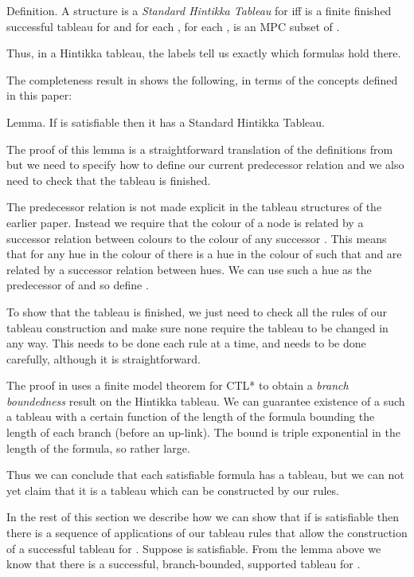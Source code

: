 \documentclass[submission,copyright,creativecommons]{eptcs}
\newenvironment{definition}{Definition. }{}
\newenvironment{lemma}{Lemma. }{}
\begin{document}
\begin{definition}
\label{def:sht}
A structure  is a
{\em Standard Hintikka Tableau} for 
iff
 is a finite
finished successful tableau for 
and
for each ,
for each ,
 is an MPC subset 
of .
\end{definition}

Thus, in a Hintikka tableau, the
labels tell us exactly which formulas
hold there.

The completeness result in \cite{Rey:startab}
shows the following, in terms of the concepts defined
in this paper:

\begin{lemma}
If  is satisfiable
then it has a
Standard Hintikka Tableau.
\end{lemma}

The proof of this lemma is a straightforward
translation of the definitions from \cite{Rey:startab}
but we need to specify how to define our current predecessor relation
 and we also need to
check that the tableau is finished.

The predecessor relation  is not made explicit in the tableau
structures of the earlier paper.
Instead we require that the
colour of  a node  is related by a
successor relation  between colours
to the colour of any successor .
This means that for any hue in the colour of 
there is a hue  in the colour of 
such that  and  are related by
a successor relation between hues.
We can use such a hue  as the predecessor of 
and so define .

To show that the tableau 
is finished,
we just need to check 
all the rules of our tableau construction
and make sure none
require the tableau to be changed in any way.
This needs to be done each rule at a time,
and needs to be done carefully,
although it is straightforward.

The proof in \cite{Rey:startab}
uses a finite model theorem
for CTL* 
to obtain a {\em branch boundedness}
result on the Hintikka tableau.
We can guarantee existence of a such a tableau
with a certain function of the length
of the formula bounding  the length of each branch
(before an up-link).
The bound is triple exponential in the
length of the formula, so rather large.

Thus we can conclude that each satisfiable formula
has a tableau,
but we can not yet claim that it
is a tableau which can be constructed
by our rules.

In the rest of this section we 
describe how
we can show that if  is satisfiable
then there is a sequence 
of applications of our tableau rules 
that allow the construction of 
a successful tableau for .
Suppose  is satisfiable.
From the lemma above we
know that there is a successful, branch-bounded, supported
tableau  for 
.
\end{document}
